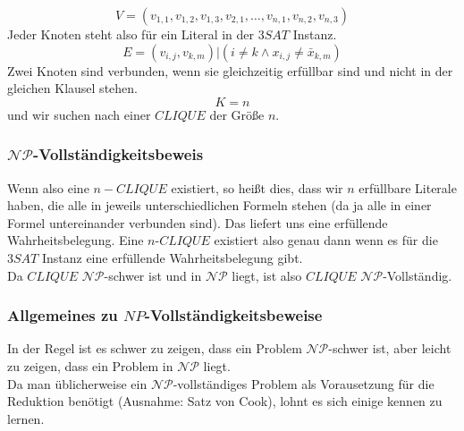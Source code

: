 \documentclass{beamer}
\begin{document}
{\begin{frame}
$$V = (v_{1,1}, v_{1,2}, v_{1,3}, v_{2,1},\ldots,v_{n,1},v_{n,2},v_{n,3})$$
Jeder Knoten steht also für ein Literal in der $3SAT$ Instanz. 
$$E = {(v_{i,j},v_{k,m})| (i \neq k \wedge x_{i,j} \neq \bar{x}_{k,m} )}$$%
Zwei Knoten sind verbunden, wenn sie gleichzeitig erfüllbar sind und nicht in der gleichen Klausel stehen. 
$$K = n$$
und wir suchen nach einer $CLIQUE$ der Größe $n$.\\
\end{frame}
\begin{frame}
\frametitle{$\mathcal{NP}$-Vollständigkeitsbeweis}
Wenn also eine $n-CLIQUE$ existiert, so heißt dies, dass wir $n$ erfüllbare Literale haben, die alle in jeweils unterschiedlichen Formeln stehen (da ja alle in einer Formel untereinander verbunden sind). Das liefert uns eine erfüllende Wahrheitsbelegung. Eine $n$-$CLIQUE$ existiert also genau dann wenn es für die $3SAT$ Instanz eine erfüllende Wahrheitsbelegung gibt.\\
Da $CLIQUE$ $\mathcal{NP}$-schwer ist und in $\mathcal{NP}$ liegt, ist also $CLIQUE$ $\mathcal{NP}$-Vollständig.
\end{frame}

\begin{frame}
\frametitle{Allgemeines zu $NP$-Vollständigkeitsbeweise}
In der Regel ist es schwer zu zeigen, dass ein Problem $\mathcal{NP}$-schwer ist, aber leicht zu zeigen, dass ein Problem in $\mathcal{NP}$ liegt.\\[8pt]
Da man üblicherweise ein $\mathcal{NP}$-vollständiges Problem als Vorausetzung für die Reduktion benötigt (Ausnahme: Satz von Cook), lohnt es sich einige kennen zu lernen.
\end{frame}

}
\end{document}
